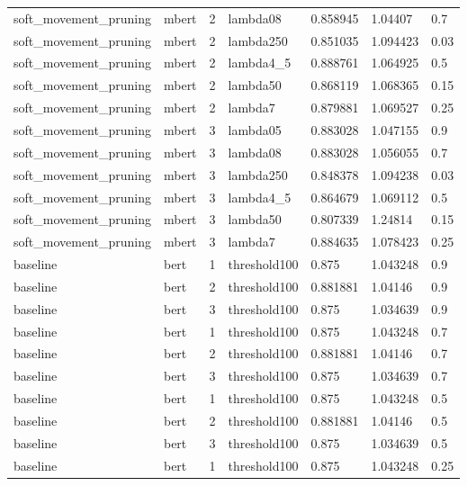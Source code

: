 \begin{tabular}{lllllll}
soft\_movement\_pruning & mbert &   2 &     lambda08 &  0.858945 &   1.04407 &    0.7 \\
soft\_movement\_pruning & mbert &   2 &    lambda250 &  0.851035 &  1.094423 &   0.03 \\
soft\_movement\_pruning & mbert &   2 &    lambda4\_5 &  0.888761 &  1.064925 &    0.5 \\
soft\_movement\_pruning & mbert &   2 &     lambda50 &  0.868119 &  1.068365 &   0.15 \\
soft\_movement\_pruning & mbert &   2 &      lambda7 &  0.879881 &  1.069527 &   0.25 \\
soft\_movement\_pruning & mbert &   3 &     lambda05 &  0.883028 &  1.047155 &    0.9 \\
soft\_movement\_pruning & mbert &   3 &     lambda08 &  0.883028 &  1.056055 &    0.7 \\
soft\_movement\_pruning & mbert &   3 &    lambda250 &  0.848378 &  1.094238 &   0.03 \\
soft\_movement\_pruning & mbert &   3 &    lambda4\_5 &  0.864679 &  1.069112 &    0.5 \\
soft\_movement\_pruning & mbert &   3 &     lambda50 &  0.807339 &   1.24814 &   0.15 \\
soft\_movement\_pruning & mbert &   3 &      lambda7 &  0.884635 &  1.078423 &   0.25 \\
             baseline &  bert &   1 & threshold100 &     0.875 &  1.043248 &    0.9 \\
             baseline &  bert &   2 & threshold100 &  0.881881 &   1.04146 &    0.9 \\
             baseline &  bert &   3 & threshold100 &     0.875 &  1.034639 &    0.9 \\
             baseline &  bert &   1 & threshold100 &     0.875 &  1.043248 &    0.7 \\
             baseline &  bert &   2 & threshold100 &  0.881881 &   1.04146 &    0.7 \\
             baseline &  bert &   3 & threshold100 &     0.875 &  1.034639 &    0.7 \\
             baseline &  bert &   1 & threshold100 &     0.875 &  1.043248 &    0.5 \\
             baseline &  bert &   2 & threshold100 &  0.881881 &   1.04146 &    0.5 \\
             baseline &  bert &   3 & threshold100 &     0.875 &  1.034639 &    0.5 \\
             baseline &  bert &   1 & threshold100 &     0.875 &  1.043248 &   0.25 \\

\end{tabular}
